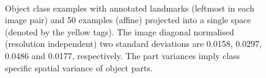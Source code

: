 \documentclass[journal]{IEEEtran}
\begin{document}
\begin{figure}[h]
\begin{center}
~
\caption{Object class examples with annotated landmarks (leftmost in each image pair) and 50 examples (affine) projected into
a single space (denoted by the yellow tags). The image diagonal normalised (resolution independent) two standard deviations are
0.0158, 0.0297, 0.0486 and 0.0177, respectively. The part variances imply class specific spatial variance of object parts.}%
\label{fig:affine_example1}
\end{center}
\end{figure}
%
\end{document}
